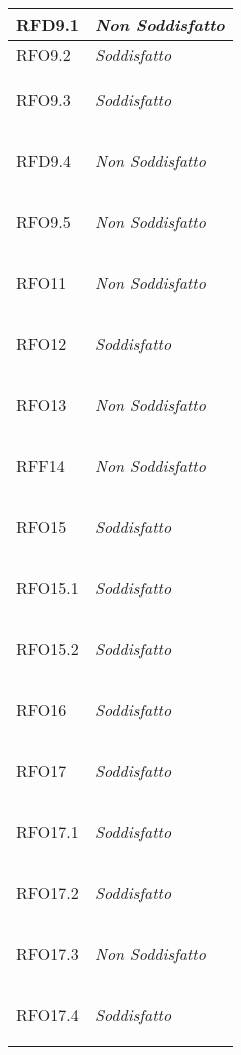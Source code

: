 \begin{longtable}{|>{\centering}m{5cm}|m{5cm}<{\centering}|}
    \hypertarget{RFD9.1}{RFD9.1}  & \textit{Non Soddisfatto}\\ \hline
   
    \hypertarget{RFO9.2}{RFO9.2} & \textit{Soddisfatto}\\ \hline
   
    \hypertarget{RFO9.3}{RFO9.3} & \textit{Soddisfatto}\\ \hline
   
    \hypertarget{RFD9.4}{RFD9.4} & \textit{Non Soddisfatto}\\ \hline
   
    \hypertarget{RFO9.5}{RFO9.5} & \textit{Non Soddisfatto}\\ \hline
   
    \hypertarget{RFO11}{RFO11} & \textit{Non Soddisfatto}\\ \hline
   
    \hypertarget{RFO12}{RFO12} & \textit{Soddisfatto}\\ \hline
   
    \hypertarget{RFO13}{RFO13} & \textit{Non Soddisfatto}\\ \hline
   
    \hypertarget{RFF14}{RFF14} & \textit{Non Soddisfatto}\\ \hline
   
    \hypertarget{RFO15}{RFO15} & \textit{Soddisfatto}\\ \hline
   
    \hypertarget{RFO15.1}{RFO15.1} & \textit{Soddisfatto}\\ \hline
   
    \hypertarget{RFO15.2}{RFO15.2} & \textit{Soddisfatto}\\ \hline
   
    \hypertarget{RFO16}{RFO16} & \textit{Soddisfatto}\\ \hline
   
    \hypertarget{RFO17}{RFO17} & \textit{Soddisfatto}\\ \hline
   
    \hypertarget{RFO17.1}{RFO17.1} & \textit{Soddisfatto}\\ \hline
   
    \hypertarget{RFO17.2}{RFO17.2} & \textit{Soddisfatto}\\ \hline
   
    \hypertarget{RFO17.3}{RFO17.3} & \textit{Non Soddisfatto}\\ \hline
   
    \hypertarget{RFO17.4}{RFO17.4} & \textit{Soddisfatto}\\ \hline
   

\end{longtable}
